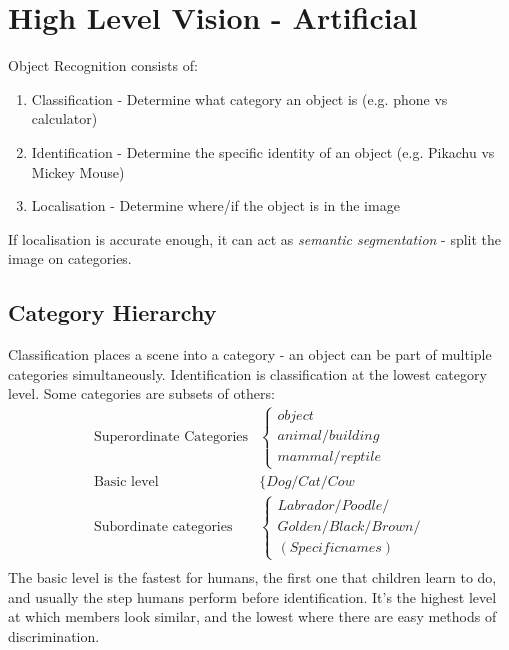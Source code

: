 \section{High Level Vision - Artificial}
Object Recognition consists of:
\begin{enumerate}
    \item Classification - Determine what category an object is (e.g. phone vs calculator)
    \item Identification - Determine the specific identity of an object (e.g. Pikachu vs Mickey Mouse)
    \item Localisation - Determine where/if the object is in the image
\end{enumerate}
If localisation is accurate enough, it can act as \emph{semantic segmentation} - split the image on categories.

\subsection{Category Hierarchy}
Classification places a scene into a category - an object can be part of multiple categories simultaneously. Identification is classification at the lowest category level. Some categories are subsets of others:
\begin{align*}
    \text{Superordinate Categories} & \begin{cases}
                                        object \\
                                        animal/building\\
                                        mammal/reptile
                                      \end{cases} \\
    \text{Basic level} &\{ Dog/Cat/Cow \\
    \text{Subordinate categories} & \begin{cases}
                                        Labrador/Poodle/ \\
                                        Golden/Black/Brown/ \\
                                        (Specific names)
                                      \end{cases} \\
\end{align*}
The basic level is the fastest for humans, the first one that children learn to do, and usually the step humans perform before identification. It's the highest level at which members look similar, and the lowest where there are easy methods of discrimination. 

